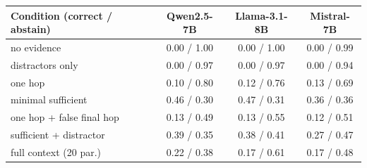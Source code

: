 \begin{tabular}{lccc}
\toprule
Condition (correct / abstain) & Qwen2.5-7B & Llama-3.1-8B & Mistral-7B \\
\midrule
no evidence & 0.00 / 1.00 & 0.00 / 1.00 & 0.00 / 0.99 \\
distractors only & 0.00 / 0.97 & 0.00 / 0.97 & 0.00 / 0.94 \\
one hop & 0.10 / 0.80 & 0.12 / 0.76 & 0.13 / 0.69 \\
minimal sufficient & 0.46 / 0.30 & 0.47 / 0.31 & 0.36 / 0.36 \\
one hop + false final hop & 0.13 / 0.49 & 0.13 / 0.55 & 0.12 / 0.51 \\
sufficient + distractor & 0.39 / 0.35 & 0.38 / 0.41 & 0.27 / 0.47 \\
full context (20 par.) & 0.22 / 0.38 & 0.17 / 0.61 & 0.17 / 0.48 \\
\bottomrule
\end{tabular}